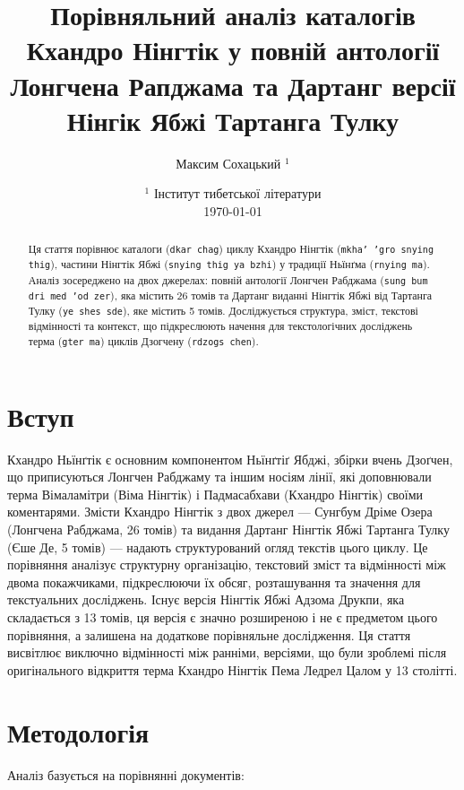 \documentclass{article}
\title{  Порівняльний аналіз
         каталогів Кхандро Нінгтік
         у повній антології Лонгчена Рапджама
         та Дартанг версії Нінгік Ябжі Тартанга Тулку}
\author{ Максим Сохацький $^1$ }
\date{   $^1$ Інститут тибетської літератури \\
         \today }
\begin{document}
\maketitle

\begin{abstract}
Ця стаття порівнює каталоги (\texttt{dkar chag}) циклу Кхандро Нінгтік (\texttt{mkha' 'gro snying thig}),
частини Нінгтік Ябжі (\texttt{snying thig ya bzhi}) у традиції Ньїнґма (\texttt{rnying ma}). Аналіз зосереджено на двох
джерелах: повній антології Лонгчен Рабджама (\texttt{sung bum dri med 'od zer}), яка містить 26 томів
та Дартанг виданні Нінгтік Ябжі від Тартанга Тулку (\texttt{ye shes sde}), яке містить 5 томів.
Досліджується структура, зміст, текстові відмінності та контекст, що підкреслюють
начення для текстологічних досліджень терма (\texttt{gter ma}) циклів Дзогчену (\texttt{rdzogs chen}).
\end{abstract}


\newpage
\tableofcontents

\newpage

\section{Вступ}

Кхандро Ньїнґтік є основним компонентом Ньїнґтіґ Ябджі, збірки вчень Дзоґчен,
що приписуються Лонгчен Рабджаму та іншим носіям лінії, які доповнювали терма
Вімаламітри (Віма Нінгтік) і Падмасабхави (Кхандро Нінгтік) своїми коментарями.
Змісти Кхандро Нінгтік з двох джерел — Сунгбум Дріме Озера (Лонгчена Рабджама, 26 томів) та видання
Дартанг Нінгтік Ябжі Тартанга Тулку (Єше Де, 5 томів) — надають структурований огляд текстів цього циклу.
Це порівняння аналізує структурну організацію, текстовий зміст та відмінності між
двома покажчиками, підкреслюючи їх обсяг, розташування та значення для текстуальних досліджень.
Існує версія Нінгтік Ябжі Адзома Друкпи, яка складається з 13 томів, ця версія є значно розширеною
і не є предметом цього порівняння, а залишена на додаткове порівняльне дослідження. Ця стаття
висвітлює виключно відмінності між ранніми, версіями, що були зроблемі після оригінального відкриття
терма Кхандро Нінгтік Пема Ледрел Цалом у 13 столітті.

\section{Методологія}
Аналіз базується на порівнянні документів:
\end{document}
